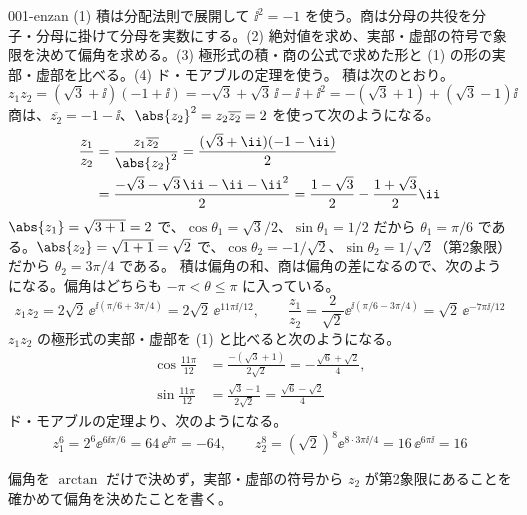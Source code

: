\documentclass[uplatex,dvipdfmx,a4paper,11pt]{jsarticle}
\begin{document}
\kaitouhen
{}
\begin{kaisetsu}{001-enzan}
\houshin (1) 積は分配法則で展開して $\ii^{2}=-1$ を使う。商は分母の共役を分子・分母に掛けて分母を実数にする。(2) 絶対値を求め、実部・虚部の符号で象限を決めて偏角を求める。(3) 極形式の積・商の公式で求めた形と (1) の形の実部・虚部を比べる。(4) ド・モアブルの定理を使う。
\keisan {} 積は次のとおり。
\[ z_{1}z_{2}=(\sqrt{3}+\ii)(-1+\ii)=-\sqrt{3}+\sqrt{3}\,\ii-\ii+\ii^{2}=-(\sqrt{3}+1)+(\sqrt{3}-1)\ii \]
商は、$\overline{z_{2}}=-1-\ii$、$\abs{z_{2}}^{2}=z_{2}\overline{z_{2}}=2$ を使って次のようになる。
\begin{align*}
  \frac{z_{1}}{z_{2}}&=\frac{z_{1}\overline{z_{2}}}{\abs{z_{2}}^{2}}=\frac{(\sqrt{3}+\ii)(-1-\ii)}{2}\\
  &=\frac{-\sqrt{3}-\sqrt{3}\,\ii-\ii-\ii^{2}}{2}=\frac{1-\sqrt{3}}{2}-\frac{1+\sqrt{3}}{2}\ii
\end{align*}
 $\abs{z_{1}}=\sqrt{3+1}=2$ で、$\cos\theta_{1}=\sqrt{3}/2$、$\sin\theta_{1}=1/2$ だから $\theta_{1}=\pi/6$ である。$\abs{z_{2}}=\sqrt{1+1}=\sqrt{2}$ で、$\cos\theta_{2}=-1/\sqrt{2}$、$\sin\theta_{2}=1/\sqrt{2}$（第2象限）だから $\theta_{2}=3\pi/4$ である。
 積は偏角の和、商は偏角の差になるので、次のようになる。偏角はどちらも $-\pi<\theta\le\pi$ に入っている。
\[ z_{1}z_{2}=2\sqrt{2}\,\ee^{\ii(\pi/6+3\pi/4)}=2\sqrt{2}\,\ee^{11\pi\ii/12},\qquad \frac{z_{1}}{z_{2}}=\frac{2}{\sqrt{2}}\ee^{\ii(\pi/6-3\pi/4)}=\sqrt{2}\,\ee^{-7\pi\ii/12} \]
$z_{1}z_{2}$ の極形式の実部・虚部を (1) と比べると次のようになる。
\begin{align*}
  \cos\frac{11\pi}{12}&=\frac{-(\sqrt{3}+1)}{2\sqrt{2}}=-\frac{\sqrt{6}+\sqrt{2}}{4},\\
  \sin\frac{11\pi}{12}&=\frac{\sqrt{3}-1}{2\sqrt{2}}=\frac{\sqrt{6}-\sqrt{2}}{4}
\end{align*}
 ド・モアブルの定理より、次のようになる。
\[ z_{1}^{6}=2^{6}\ee^{6\ii\pi/6}=64\,\ee^{\ii\pi}=-64,\qquad z_{2}^{8}=(\sqrt{2})^{8}\ee^{8\cdot3\pi\ii/4}=16\,\ee^{6\pi\ii}=16 \]
\begin{ronten}
  \item {} 偏角を $\arctan$ だけで決めず，実部・虚部の符号から $z_{2}$ が第2象限にあることを確かめて偏角を決めたことを書く。

\end{ronten}
\end{kaisetsu}
\end{document}
